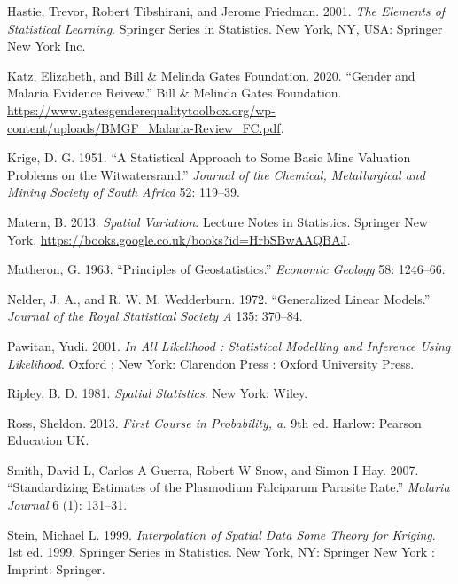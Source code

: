\documentclass[
  letterpaper,
]{krantz}
\newlength{\cslhangindent}
\newlength{\cslentryspacingunit} %
\newenvironment{CSLReferences}[2] %
 {%
  \setlength{\parindent}{0pt}
  \ifodd #1
  \let\oldpar\par
  \def\par{\hangindent=\cslhangindent\oldpar}
  \fi
  \setlength{\parskip}{#2\cslentryspacingunit}
 }%
 {}
\begin{document}
\begin{CSLReferences}{1}{0}
\leavevmode{}%
Hastie, Trevor, Robert Tibshirani, and Jerome Friedman. 2001. \emph{The
Elements of Statistical Learning}. Springer Series in Statistics. New
York, NY, USA: Springer New York Inc.

\leavevmode{}%
Katz, Elizabeth, and Bill \& Melinda Gates Foundation. 2020. {``Gender
and Malaria Evidence Reivew.''} Bill \& Melinda Gates Foundation.
\url{https://www.gatesgenderequalitytoolbox.org/wp-content/uploads/BMGF_Malaria-Review_FC.pdf}.

\leavevmode{}%
Krige, D. G. 1951. {``A Statistical Approach to Some Basic Mine
Valuation Problems on the Witwatersrand.''} \emph{Journal of the
Chemical, Metallurgical and Mining Society of South Africa} 52: 119--39.

\leavevmode{}%
Matern, B. 2013. \emph{Spatial Variation}. Lecture Notes in Statistics.
Springer New York.
\url{https://books.google.co.uk/books?id=HrbSBwAAQBAJ}.

\leavevmode{}%
Matheron, G. 1963. {``Principles of Geostatistics.''} \emph{Economic
Geology} 58: 1246--66.

\leavevmode{}%
Nelder, J. A., and R. W. M. Wedderburn. 1972. {``Generalized Linear
Models.''} \emph{Journal of the Royal Statistical Society A} 135:
370--84.

\leavevmode{}%
Pawitan, Yudi. 2001. \emph{In All Likelihood : Statistical Modelling and
Inference Using Likelihood}. Oxford ; New York: Clarendon Press : Oxford
University Press.

\leavevmode{}%
Ripley, B. D. 1981. \emph{Spatial Statistics}. New York: Wiley.

\leavevmode{}%
Ross, Sheldon. 2013. \emph{First Course in Probability, a.} 9th ed.
Harlow: Pearson Education UK.

\leavevmode{}%
Smith, David L, Carlos A Guerra, Robert W Snow, and Simon I Hay. 2007.
{``Standardizing Estimates of the Plasmodium Falciparum Parasite
Rate.''} \emph{Malaria Journal} 6 (1): 131--31.

\leavevmode{}%
Stein, Michael L. 1999. \emph{Interpolation of Spatial Data Some Theory
for Kriging}. 1st ed. 1999. Springer Series in Statistics. New York, NY:
Springer New York : Imprint: Springer.


\end{CSLReferences}
\end{document}
